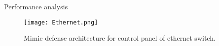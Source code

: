 \documentclass{beamer}
\begin{document}
\begin{frame}{Performance analysis}
    \begin{figure}[!]
        \texttt{[image: Ethernet.png]}
        \caption{Mimic defense architecture for control panel of ethernet switch.}
    \end{figure}
\end{frame}
\end{document}
